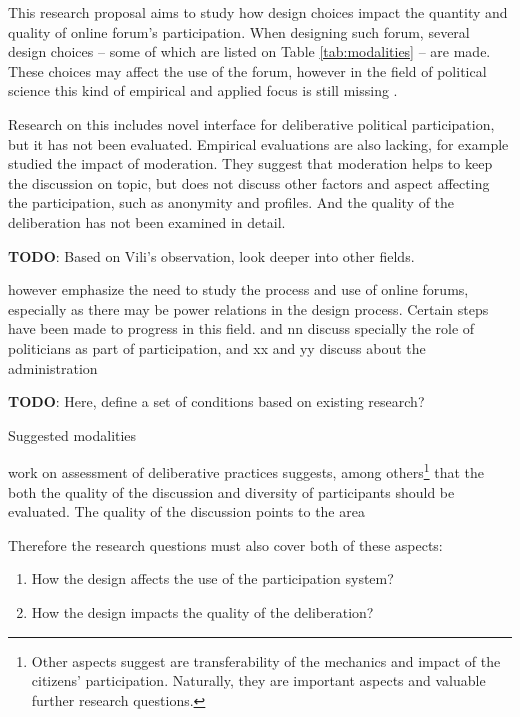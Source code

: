 \documentclass[journal,a4paper]{IEEEtran}
\begin{document}
This research proposal aims to study how design choices impact the quantity and quality of online forum's participation. When designing such forum, several design choices -- some of which are listed on Table \ref{tab:modalities} -- are made. These choices may affect the use of the forum, however in the field of political science this kind of empirical and applied focus is still missing \cite[256]{wright12}.

Research on this includes  novel interface for deliberative political participation, but it has not been evaluated. Empirical evaluations are also lacking, for example  studied the impact of moderation. They suggest that moderation helps to keep the discussion on topic, but does not discuss other factors and aspect affecting the participation, such as anonymity and profiles. And the quality of the deliberation has not been examined in detail.

\textbf{TODO}: Based on Vili's observation, look deeper into other fields.

 however emphasize the need to study the process and use of online forums, especially as there may be power relations in the design process. Certain steps have been made to progress in this field.  and nn discuss specially the role of politicians as part of participation, and xx and yy discuss about the administration

\begin{table}
\textbf{TODO}: Here, define a set of conditions based on existing research?
\caption{Suggested modalities}
\label{tab:modalities}
\end{table}

 work on assessment of deliberative practices suggests, among others\footnote{Other aspects  suggest are transferability of the mechanics and impact of the citizens' participation. Naturally, they are important aspects and valuable further research questions.} that the both the quality of the discussion and diversity of participants should be evaluated. The quality of the discussion points to the area

Therefore the research questions must also cover both of these aspects:

\begin{enumerate}
\item How the design affects the use of the participation system?
\item How the design impacts the quality of the deliberation?
\end{enumerate}
\end{document}
